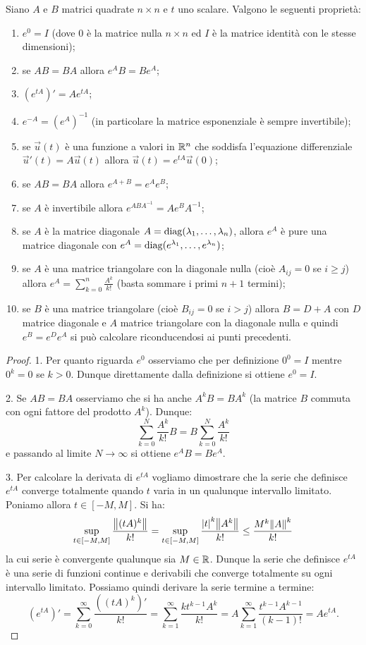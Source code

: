 \begin{theorem}
Siano $A$ e $B$ matrici quadrate $n\times n$ e $t$ uno scalare.
Valgono le seguenti proprietà:
\begin{enumerate}
\item $e^0 = I$ (dove $0$ è la matrice nulla $n\times n$ ed $I$ è la
  matrice identità con le stesse dimensioni);
\item se $AB=BA$ allora $e^A B = B e^A$;
\item $(e^{tA})' = A e^{tA}$;
\item $e^{-A} = (e^A)^{-1}$ (in particolare la matrice esponenziale è
  sempre invertibile);
\item se $\vec u(t)$ è una funzione a valori in ${\mathbb R}^n$ che soddisfa
  l'equazione differenziale $\vec u'(t) = A\vec u(t)$ allora
  $\vec u(t) = e^{tA} \vec u(0)$;
\item se $AB=BA$ allora $e^{A+B} = e^A e^B$;
\item se $A$ è invertibile allora $e^{ABA^{-1}} = Ae^BA^{-1}$;
\item se $A$ è la matrice diagonale $A = \operatorname{diag}(\lambda_1, \dots, \lambda_n)$,
allora $e^A$
 è pure una matrice diagonale con $e^A = \operatorname{diag}(e^{\lambda_1},\dots, e^{\lambda_n})$;
\item se $A$ è una matrice triangolare con la diagonale nulla (cioè
  $A_{ij}=0$ se $i\ge j$) allora $e^A = \sum_{k=0}^n \frac{A^k}{k!}$
  (basta sommare i primi $n+1$ termini);
\item se $B$ è una matrice triangolare (cioè $B_{ij}=0$ se $i > j$)
  allora $B = D + A$ con $D$ matrice diagonale e $A$ matrice
  triangolare con la diagonale nulla e quindi $e^B = e^De^A$ si può
  calcolare riconducendosi ai punti precedenti.
\end{enumerate}
\begin{proof}
1. Per quanto riguarda $e^0$ osserviamo che per definizione $0^0=I$
mentre $0^k=0$ se $k>0$. Dunque direttamente dalla definizione si
ottiene $e^0=I$.

2. Se $AB=BA$ osserviamo che si ha anche $A^k B=B A^k$ (la matrice $B$
commuta con ogni fattore del prodotto $A^k$). Dunque:
\[
 \sum_{k=0}^N \frac{A^k}{k!} B = B \sum_{k=0}^N \frac{A^k}{k!}
\]
e passando al limite $N\to \infty$ si ottiene $e^A B = B e^A$.

3. Per calcolare la derivata di $e^{tA}$ vogliamo dimostrare che la serie
che definisce $e^{tA}$ converge totalmente quando $t$ varia in un
qualunque intervallo limitato. Poniamo allora $t\in [-M,M]$. Si ha:
\[
  \sup_{t\in[-M,M]}\frac{{\left\Vert  (tA)^k\right\Vert}}{k!}
  = \sup_{t\in[-M,M]}\frac{{\left| t\right|}^k {\left\Vert  A^k\right\Vert}}{k!}
  \le \frac{M^k{\left\Vert  A\right\Vert}^k}{k!}
\]
la cui serie è convergente qualunque sia $M\in {\mathbb R}$. Dunque la serie
che definisce $e^{tA}$ è una serie di funzioni continue e derivabili
che converge totalmente su ogni intervallo limitato. Possiamo quindi
derivare la serie termine a termine:
\[
(e^{tA})' = \sum_{k=0}^\infty \frac{((tA)^k)'}{k!}
 = \sum_{k=1}^\infty \frac{kt^{k-1} A^k}{k!}
 = A \sum_{k=1}^\infty \frac{t^{k-1}A^{k-1}}{(k-1)!}
 = A e^{tA}.
\]


\end{proof}
\end{theorem}

